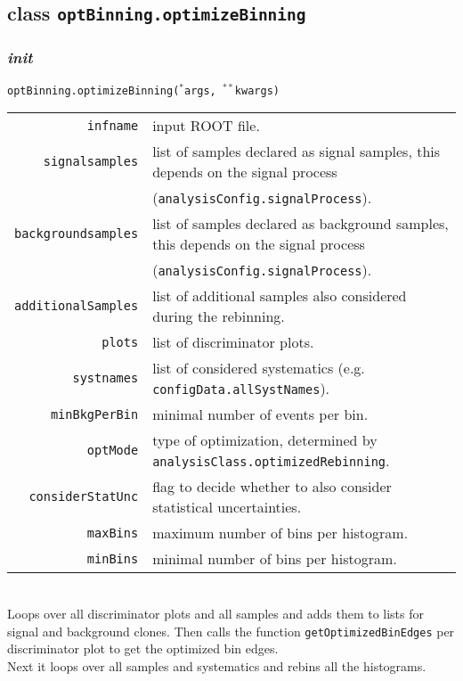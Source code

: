 \documentclass[12pt, a4paper]{article}
\newcommand{\args}{$^*$args}
\newcommand{\kwargs}{$^{**}$kwargs}
\begin{document}
\subsection{class \texttt{optBinning.optimizeBinning}}

\subsubsection{\textit{init}}
\texttt{optBinning.optimizeBinning(\args, \kwargs)}\\
\begin{tabular}{r|l}
\hline
\texttt{infname}			&	input ROOT file.\\
\texttt{signalsamples}		&	list of samples declared as signal samples, this depends on the signal process\\
							&	(\texttt{analysisConfig.signalProcess}).\\
\texttt{backgroundsamples}	&	list of samples declared as background samples, this depends on the signal process\\
							&	(\texttt{analysisConfig.signalProcess}).\\
\texttt{additionalSamples}	&	list of additional samples also considered during the rebinning.\\
\texttt{plots}				&	list of discriminator plots.\\
\texttt{systnames}			&	list of considered systematics (e.g. \texttt{configData.allSystNames}).\\
\texttt{minBkgPerBin}		&	minimal number of events per bin.\\
\texttt{optMode}			&	type of optimization, determined by \texttt{analysisClass.optimizedRebinning}.\\
\texttt{considerStatUnc}	&	flag to decide whether to also consider statistical uncertainties.\\
\texttt{maxBins}			&	maximum number of bins per histogram.\\
\texttt{minBins}			&	minimal number of bins per histogram.\\
\hline
\end{tabular}
\\
Loops over all discriminator plots and all samples and adds them to lists for signal and background clones. Then calls the function \texttt{getOptimizedBinEdges} per discriminator plot to get the optimized bin edges. \\
Next it loops over all samples and systematics and rebins all the histograms.
\end{document}
